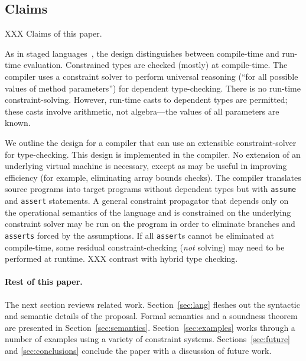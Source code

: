 \subsection{Claims}

XXX Claims of this paper.

%
%

As in staged languages~\cite{nielson-multistage,ts97-multistage},
the design distinguishes between
compile-time and run-time evaluation. Constrained types are
checked (mostly) at compile-time.
The compiler uses a
constraint solver to perform universal reasoning (``for all possible
values of method parameters'') for dependent type-checking.  There is
no run-time constraint-solving.  However,
run-time casts to dependent types are
permitted; these casts involve arithmetic, not
algebra---the values of all parameters are known.

We outline the design for a compiler that can use an extensible
constraint-solver for type-checking.
This design is implemented in the \Xten{} compiler.
No extension of an
underlying virtual machine is necessary, except as may be useful in
improving efficiency (for example, eliminating array bounds checks).
The compiler translates source
programs into target programs without dependent types
but with {\tt assume} and {\tt assert} statements.
A general
constraint propagator that depends only on the operational semantics
of the language and is constrained on the underlying constraint solver
may be run on the program in order to eliminate branches and {\tt
asserts} forced by the assumptions. If all {\tt assert}s cannot be
eliminated at compile-time, some residual constraint-checking
({\em not} solving) may need to be performed at runtime.
%
XXX contrast with hybrid type checking.

\paragraph{Rest of this paper.}

The next section reviews related work.
Section~\ref{sec:lang} fleshes out the syntactic and semantic details of the
proposal.
Formal semantics
and a soundness theorem
are presented in Section~\ref{sec:semantics}.
Section~\ref{sec:examples} works through a number of
examples using a variety of constraint systems.
Sections~\ref{sec:future}
and \ref{sec:conclusions} conclude the paper with a discussion of
future work.

